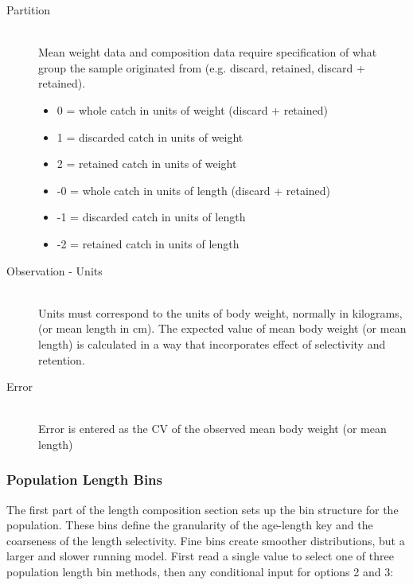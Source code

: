 \begin{description}
	\item[Partition]\hfill\\
	Mean weight data and composition data require specification of what group the sample originated from (e.g. discard, retained, discard + retained).
	\begin{itemize}
		\item 0 = whole catch in units of weight (discard + retained)
		\item 1 = discarded catch in units of weight
		\item 2 = retained catch in units of weight
		\item -0 = whole catch in units of length (discard + retained)
		\item -1 = discarded catch in units of length
		\item -2 = retained catch in units of length
	\end{itemize}
	\item[Observation - Units]\hfill\\
	Units must correspond to the units of body weight, normally in kilograms, (or mean length in cm).  The expected value of mean body weight (or mean length) is calculated in a way that incorporates effect of selectivity and retention.
	\item[Error]\hfill\\
	Error is entered as the CV of the observed mean body weight (or mean length)
\end{description}

\subsubsection{Population Length Bins}
The first part of the length composition section sets up the bin structure for the population.  These bins define the granularity of the age-length key and the coarseness of the length selectivity.  Fine bins create smoother distributions, but a larger and slower running model.
First read a single value to select one of three population length bin methods, then any conditional input for options 2 and 3:


